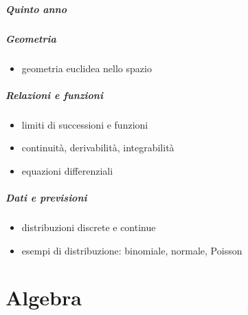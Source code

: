 \documentclass[letterpaper,10pt,italian]{jupyterBook}
\begin{document}
\subsubsection*{Quinto anno}
\subsubsection*{Geometria}
\begin{itemize}
\item {} 
\sphinxAtStartPar
geometria euclidea nello spazio

\end{itemize}
\subsubsection*{Relazioni e funzioni}
\begin{itemize}
\item {} 
\sphinxAtStartPar
limiti di successioni e funzioni

\item {} 
\sphinxAtStartPar
continuità, derivabilità, integrabilità

\item {} 
\sphinxAtStartPar
equazioni differenziali

\end{itemize}
\subsubsection*{Dati e previsioni}
\begin{itemize}
\item {} 
\sphinxAtStartPar
distribuzioni discrete e continue

\item {} 
\sphinxAtStartPar
esempi di distribuzione: binomiale, normale, Poisson

\end{itemize}

\sphinxstepscope


\part{Algebra}

\sphinxstepscope
\end{document}

